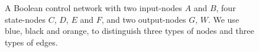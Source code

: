 
 
 \begin{figure}[thpb]
      \centering
      
      \caption{A Boolean control network with two input-nodes $A$ and $B$, four state-nodes $C$, $D$, $E$ and $F$, and two output-nodes $G$, $W$. We use blue, black and orange, to distinguish three types of nodes and three types of edges.}
      \label{fig:1}
  \end{figure}


